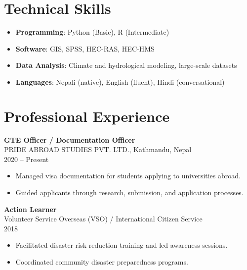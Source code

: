 \documentclass[a4paper,10pt]{article}
\begin{document}
\vspace{0.2cm}

\section*{Technical Skills}
\begin{itemize}
    \item \textbf{Programming}: Python (Basic), R (Intermediate)
    \item \textbf{Software}: GIS, SPSS, HEC-RAS, HEC-HMS
    \item \textbf{Data Analysis}: Climate and hydrological modeling, large-scale datasets
    \item \textbf{Languages}: Nepali (native), English (fluent), Hindi (conversational)
\end{itemize}

\vspace{0.2cm}

\section*{Professional Experience}
\noindent
\textbf{GTE Officer / Documentation Officer} \\
PRIDE ABROAD STUDIES PVT. LTD., Kathmandu, Nepal \\
2020 – Present \\
\begin{itemize}
    \item Managed visa documentation for students applying to universities abroad.
    \item Guided applicants through research, submission, and application processes.
\end{itemize}

\noindent
\textbf{Action Learner} \\
Volunteer Service Overseas (VSO) / International Citizen Service \\
2018 \\
\begin{itemize}
    \item Facilitated disaster risk reduction training and led awareness sessions.
    \item Coordinated community disaster preparedness programs.
\end{itemize}

\vspace{0.2cm}

\end{document}
